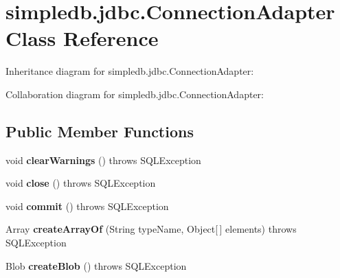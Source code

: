 \hypertarget{classsimpledb_1_1jdbc_1_1ConnectionAdapter}{}\section{simpledb.\+jdbc.\+Connection\+Adapter Class Reference}
\label{classsimpledb_1_1jdbc_1_1ConnectionAdapter}


Inheritance diagram for simpledb.\+jdbc.\+Connection\+Adapter\+:


Collaboration diagram for simpledb.\+jdbc.\+Connection\+Adapter\+:
\subsection*{Public Member Functions}
\begin{DoxyCompactItemize}
\item 
\mbox{\label{classsimpledb_1_1jdbc_1_1ConnectionAdapter_acd193343574e71b4972a5ae59f81e44b}} 
void {\bfseries clear\+Warnings} ()  throws S\+Q\+L\+Exception 
\item 
\mbox{\label{classsimpledb_1_1jdbc_1_1ConnectionAdapter_abddc89085c2aa8128b495460226c3f91}} 
void {\bfseries close} ()  throws S\+Q\+L\+Exception 
\item 
\mbox{\label{classsimpledb_1_1jdbc_1_1ConnectionAdapter_a9edaad736a5acc5068fe3dc90efe80b1}} 
void {\bfseries commit} ()  throws S\+Q\+L\+Exception 
\item 
\mbox{\label{classsimpledb_1_1jdbc_1_1ConnectionAdapter_a7d91d5fab15b85a613fc5649c0da812b}} 
Array {\bfseries create\+Array\+Of} (String type\+Name, Object\mbox{[}$\,$\mbox{]} elements)  throws S\+Q\+L\+Exception 
\item 
\mbox{\label{classsimpledb_1_1jdbc_1_1ConnectionAdapter_ae4a9fad412ceef2cab809701bc70bf16}} 
Blob {\bfseries create\+Blob} ()  throws S\+Q\+L\+Exception 
\item 
\mbox{\label{classsimpledb_1_1jdbc_1_1ConnectionAdapter_a47285474fda6b9f11f2e59f06be154b0}} 

\end{DoxyCompactItemize}
